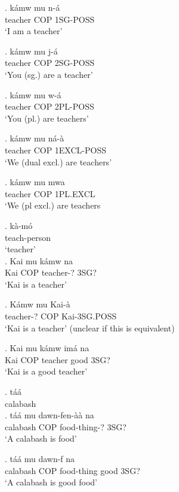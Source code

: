 \documentclass{assets/fieldnotes}
\begin{document}
{\exg. kámw mu n-á\\
teacher COP 1SG-POSS\\
`I am a teacher'\\

\exg. kámw mu j-á\\
teacher COP 2SG-POSS\\
`You (sg.) are a teacher'

\exg. kámw mu w-á\\
teacher COP 2PL-POSS\\
`You (pl.) are teachers'

\exg. kámw mu ná-à\\
teacher COP 1EXCL-POSS\\
`We (dual excl.) are teachers'

\exg. kámw mu mwa\\
teacher COP 1PL.EXCL\\
`We (pl excl.) are teachers


\exg. kà-mó\\
teach-person\\
`teacher’\\

\exg. Kai mu kámw na\\
Kai COP teacher-? 3SG?\\
`Kai is a teacher'
\\

\exg. Kámw mu Kai-à\\
teacher-? COP Kai-3SG.POSS\\
`Kai is a teacher' (unclear if this is equivalent)


\exg. Kai mu kámw \textipa{\textltailn}imá na\\
Kai COP teacher good 3SG?\\
`Kai is a good teacher'

\exg. táá\\
calabash\\

\exg. táá mu dawn-fen-àà na\\
calabash COP food-thing-? 3SG?\\
`A calabash is food'

\exg. táá mu dawn-f  na\\
calabash COP food-thing good 3SG?\\
`A calabash is good food'


}
\end{document}
